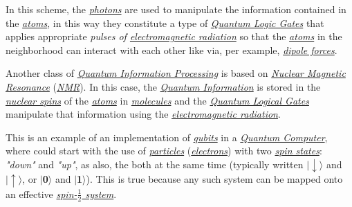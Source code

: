 \documentclass[conference]{IEEEtran}
\begin{document}
\vspace{4pt}

In this scheme, the \href{https://en.wikipedia.org/wiki/Photon}{\textit{photons}} are used to manipulate the information contained in the \href{https://en.wikipedia.org/wiki/Atom}{\textit{atoms}}, in this way they constitute a type of \href{https://en.wikipedia.org/wiki/Quantum_logic_gate}{\textit{Quantum Logic Gates}} that applies appropriate \textit{pulses of \href{https://en.wikipedia.org/wiki/Electromagnetic_radiation}{electromagnetic radiation}} so that the \href{https://en.wikipedia.org/wiki/Atom}{\textit{atoms}} in the neighborhood can interact with each other like via, per example, \href{https://en.wikipedia.org/wiki/Intermolecular_force}{\textit{dipole forces}}.

\vspace{4pt}

Another class of \href{https://en.wikipedia.org/wiki/Quantum_information_science}{\textit{Quantum Information Processing}} is based on \href{https://en.wikipedia.org/wiki/Nuclear_magnetic_resonance}{\textit{Nuclear Magnetic Resonance}} (\href{https://en.wikipedia.org/wiki/Nuclear_magnetic_resonance}{\textit{NMR}}). In this case, the \href{https://en.wikipedia.org/wiki/Quantum_information}{\textit{Quantum Information}} is stored in the \href{https://en.wikipedia.org/wiki/Spin_(physics)}{\textit{nuclear spins}} of the \href{https://en.wikipedia.org/wiki/Atom}{\textit{atoms}} in \href{https://en.wikipedia.org/wiki/Molecule}{\textit{molecules}} and the \href{https://en.wikipedia.org/wiki/Quantum_logic_gate}{\textit{Quantum Logical Gates}} manipulate that information using the \href{https://en.wikipedia.org/wiki/Electromagnetic_radiation}{\textit{electromagnetic radiation}}.

\vspace{4pt}

This is an example of an implementation of \href{https://en.wikipedia.org/wiki/Qubit}{\textit{qubits}} in a \href{https://en.wikipedia.org/wiki/Quantum_computing}{\textit{Quantum Computer}}, where could start with the use of \href{https://en.wikipedia.org/wiki/Particle}{\textit{particles}} (\href{https://en.wikipedia.org/wiki/Electron}{\textit{electrons}}) with two \href{https://en.wikipedia.org/wiki/Spin_State}{\textit{spin states}}: \textit{"down"} and \textit{"up"}, as also, the both at the same time (typically written \textbf{$\mid\downarrow\rangle$} and \textbf{$\mid\uparrow\rangle$}, or \textbf{$\mid$0$\rangle$} and \textbf{$\mid$1$\rangle$}). This is true because any such system can be mapped onto an effective \href{https://en.wikipedia.org/wiki/Spin-\%C2\%BD}{\textit{spin-$\frac{1}{2}$ system}}.
\end{document}
